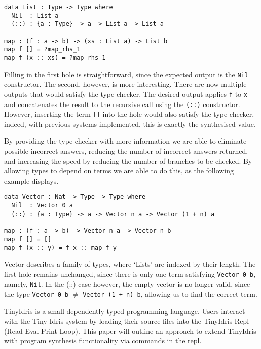 \documentclass[a4paper]{article}
\begin{document}
\begin{center}
\begin{verbatim}
data List : Type -> Type where
  Nil  : List a
  (::) : {a : Type} -> a -> List a -> List a

map : (f : a -> b) -> (xs : List a) -> List b 
map f [] = ?map_rhs_1
map f (x :: xs) = ?map_rhs_1
\end{verbatim}
\end{center}

Filling in the first hole is straightforward, since the expected output 
is the \texttt{Nil} constructor. The second, however, is more interesting.
There are now multiple outputs that would satisfy the type checker. 
The desired output applies \texttt{f} to \texttt{x} and concatenates the result to the
recursive call using the \texttt{(::)} constructor. However, inserting the term
\texttt{[]} into the hole would also satisfy the type checker, indeed,
with previous systems implemented, this is exactly the synthesised 
value.

By providing the type checker with more information we are able to 
eliminate possible incorrect answers, reducing the number of incorrect 
answers returned, and increasing the speed by reducing the number of 
branches to be checked. By allowing types to depend on terms we are 
able to do this, as the following example displays.

\begin{center}
\begin{verbatim}
data Vector : Nat -> Type -> Type where
  Nil  : Vector 0 a
  (::) : {a : Type} -> a -> Vector n a -> Vector (1 + n) a

map : (f : a -> b) -> Vector n a -> Vector n b
map f [] = []
map f (x :: y) = f x :: map f y
\end{verbatim}
\end{center}

Vector describes a family of types, where `Lists' are indexed
by their length. The first hole remains unchanged, since there is 
only one term satisfying \texttt{Vector 0 b}, namely, \texttt{Nil}.
In the (::) case however, the empty vector is no longer valid,
since the type \texttt{Vector 0 b} \(\neq\) \texttt{Vector (1 + n) b},
allowing us to find the correct term. 

TinyIdris is a small dependently typed programming language.
Users interact with the Tiny Idris system by loading their source files
into the TinyIdris Repl (Read Eval Print Loop). This paper will outline 
an approach to extend TinyIdris with program synthesis functionality via
commands in the repl.
\end{document}
